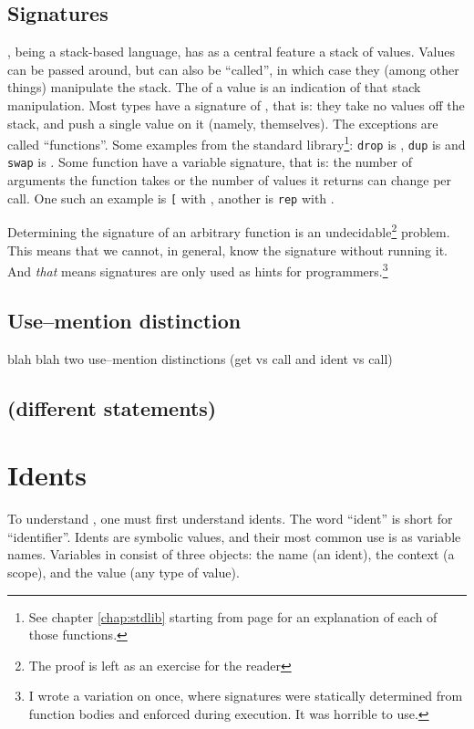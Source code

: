\subsection{Signatures}
\dv{}, being a stack-based language, has as a central feature a stack of
values. Values can be passed around, but can also be ``called'', in which case
they (among other things) manipulate the stack. The  of a
value is an indication of that stack manipulation. Most types have a signature
of , that is: they take no values off the stack, and push a single
value on it (namely, themselves). The exceptions are called ``functions''.
Some examples from the standard library\footnote{See chapter \ref{chap:stdlib} starting from page \pageref{chap:stdlib} for an explanation of
each of those functions.}: \verb!drop! is , \verb!dup!
is  and \verb!swap! is . Some function have a variable
signature, that is: the number of arguments the function takes or the number of
values it returns can change per call. One such an example is \verb![! with
, another is \verb!rep! with .

Determining the signature of an arbitrary function is an undecidable\footnote{The
proof is left as an exercise for the reader} problem. This means that we
cannot, in general, know the signature without running it. And \emph{that}
means signatures are only used as hints for programmers.\footnote{I wrote a
variation on \dv{} once, where signatures were statically determined from
function bodies and enforced during execution. It was horrible to use.}

\subsection{Use--mention distinction}
blah blah two use--mention distinctions (get vs call and ident vs call)

\subsection{(different statements)}

\section{Idents}
To understand \dv, one must first understand idents. The word
``ident'' is short for ``identifier''. Idents are symbolic values,
and their most common use is as variable names. Variables in \dv{}
consist of three objects: the name (an ident), the context (a scope),
and the value (any type of value).


